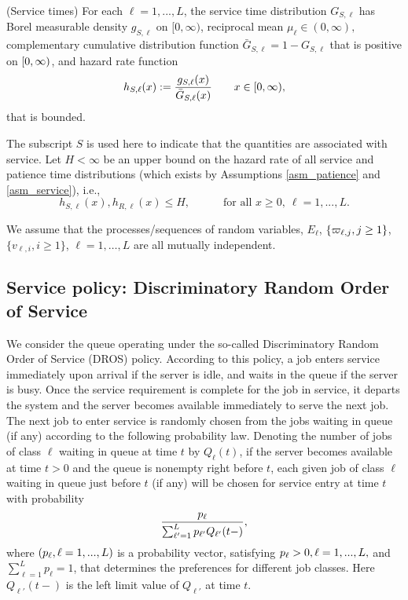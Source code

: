 \documentclass[stsy]{informs-stsy}
\begin{document}
\begin{assumption}\label{asm_service}
  (Service times) For each $\ell=1,...,L$, the service time distribution $G_{S,\ell}$ has Borel measurable density $g_{S,\ell}$ on $[0,\infty)$, reciprocal mean $\mu_{\ell}\in(0,\infty),$ complementary cumulative distribution function $\bar G_{S,\ell}=1-G_{S,\ell}$ that is positive on $[0,\infty)$, and hazard rate function 
\[
h_{S,\ell}(x):=\frac{g_{S,\ell}(x)}{\bar G_{S,\ell}(x)}\quad\quad x\in[0,\infty),
\]
that is bounded.
\end{assumption}
The subscript $S$ is used here to indicate that the quantities are associated with service. Let $H<\infty$ be an upper bound on the hazard rate of all service and patience time distributions (which exists by Assumptions \ref{asm_patience} and \ref{asm_service}), i.e.,
\begin{equation}\label{def-H}
h_{S,\ell}(x),h_{R,\ell}(x)\leq H,  \quad\quad\quad \text{for all }x\geq0,\ \ell=1,...,L.
\end{equation}

We assume that the processes/sequences of random variables,  $E_\ell$, $\{ \varpi_{\ell, j}, j\geq 1\}$, $\{v_{\ell, i} , i\geq 1\}$, $\ell =1, \ldots, L$ are all mutually independent.

\subsection{Service policy: Discriminatory Random Order of Service}
We consider the queue operating under the so-called Discriminatory Random Order of Service (DROS) policy. According to this policy, a job  enters service immediately upon arrival if the server is idle, and waits in the queue if the server is busy. Once the service requirement is complete for the job in service, it departs the system and the server becomes available immediately to serve the next job. The next job to enter service is randomly chosen from the jobs waiting in queue (if any) according to the following probability law. Denoting the number of jobs of class $\ell$ waiting in queue at time $t$ by $Q_\ell(t)$, if the server becomes available at time $t>0$ and the queue is nonempty right before $t$, each given job of class $\ell$ waiting in queue just before $t$ (if any) will be chosen for service entry at time $t$ with probability
\begin{equation}\label{DROS}
\frac{p_\ell}{\sum_{\ell'=1}^Lp_{\ell'}Q_{\ell'}(t-)},
\end{equation}
where $(p_\ell,\ell=1,...,L)$ is a probability vector, satisfying $p_\ell>0,\ell=1,...,L,$ and $\sum_{\ell=1}^Lp_{\ell}=1$, that determines the preferences for different job classes.
Here $Q_{\ell'}(t-)$ is the left limit value of $Q_{\ell'}$ at time $t$.
\end{document}
